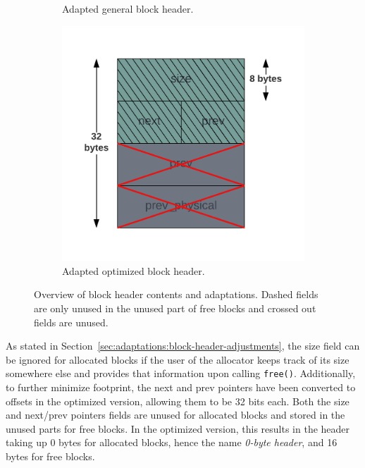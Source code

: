\begin{figure}[H]
\begin{subfigure}[b]{0.3\textwidth}
        \caption{Adapted general block header.}
        \label{fig:blockheader_adap_general}
    \end{subfigure}%
    \hfill
    \begin{subfigure}[b]{0.3\textwidth}
        \centering
        \includegraphics[width=\textwidth]{figures/blockheader_adap_optimized.png}
        \caption{Adapted optimized block header.}
        \label{fig:blockheader_adap_optimized}
    \end{subfigure}
    \caption{Overview of block header contents and adaptations. Dashed fields are only unused in the unused part of free blocks and crossed out fields are unused.}
    \label{fig:blockheader_adaptations}
\end{figure}

As stated in Section~\ref{sec:adaptations:block-header-adjustments}, the size field can be ignored for allocated blocks if the user of the allocator keeps track of its size somewhere else and provides that information upon calling \texttt{free()}. Additionally, to further minimize footprint, the next and prev pointers have been converted to offsets in the optimized version, allowing them to be 32 bits each. Both the size and next/prev pointers fields are unused for allocated blocks and stored in the unused parts for free blocks. In the optimized version, this results in the header taking up 0 bytes for allocated blocks, hence the name \textit{0-byte header}, and 16 bytes for free blocks.

